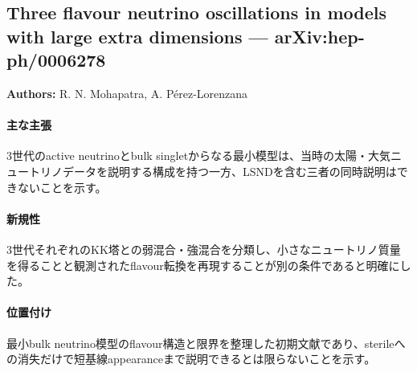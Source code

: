\subsection{Three flavour neutrino oscillations in models with large extra dimensions --- arXiv:hep-ph/0006278}

\textbf{Authors:} R. N. Mohapatra, A. P\'erez-Lorenzana

\paragraph{主な主張}
3世代のactive neutrinoとbulk singletからなる最小模型は、当時の太陽・大気ニュートリノデータを説明する構成を持つ一方、LSNDを含む三者の同時説明はできないことを示す\cite{Mohapatra:2000ThreeFlavour}。

\paragraph{新規性}
3世代それぞれのKK塔との弱混合・強混合を分類し、小さなニュートリノ質量を得ることと観測されたflavour転換を再現することが別の条件であると明確にした。

\paragraph{位置付け}
最小bulk neutrino模型のflavour構造と限界を整理した初期文献であり、sterileへの消失だけで短基線appearanceまで説明できるとは限らないことを示す。
